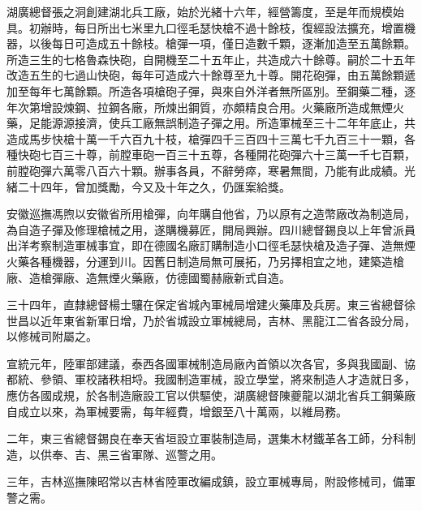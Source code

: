 \begin{pinyinscope}
湖廣總督張之洞創建湖北兵工廠，始於光緒十六年，經營籌度，至是年而規模始具。初辦時，每日所出七米里九口徑毛瑟快槍不過十餘枝，復經設法擴充，增置機器，以後每日可造成五十餘枝。槍彈一項，僅日造數千顆，逐漸加造至五萬餘顆。所造三生的七格魯森快砲，自開機至二十五年止，共造成六十餘尊。嗣於二十五年改造五生的七過山快砲，每年可造成六十餘尊至九十尊。開花砲彈，由五萬餘顆遞加至每年七萬餘顆。所造各項槍砲子彈，與來自外洋者無所區別。至鋼藥二種，逐年次第增設煉鋼、拉鋼各廠，所煉出鋼質，亦頗精良合用。火藥廠所造成無煙火藥，足能源源接濟，使兵工廠無誤制造子彈之用。所造軍械至三十二年年底止，共造成馬步快槍十萬一千六百九十枝，槍彈四千三百四十三萬七千九百三十一顆，各種快砲七百三十尊，前膛車砲一百三十五尊，各種開花砲彈六十三萬一千七百顆，前膛砲彈六萬零八百六十顆。辦事各員，不辭勞瘁，寒暑無間，乃能有此成績。光緒二十四年，曾加獎勵，今又及十年之久，仍匯案給獎。

安徽巡撫馮煦以安徽省所用槍彈，向年購自他省，乃以原有之造幣廠改為制造局，為自造子彈及修理槍械之用，遂購機募匠，開局興辦。四川總督錫良以上年曾派員出洋考察制造軍械事宜，即在德國名廠訂購制造小口徑毛瑟快槍及造子彈、造無煙火藥各種機器，分運到川。因舊日制造局無可展拓，乃另擇相宜之地，建築造槍廠、造槍彈廠、造無煙火藥廠，仿德國蜀赫廠新式自造。

三十四年，直隸總督楊士驤在保定省城內軍械局增建火藥庫及兵房。東三省總督徐世昌以近年東省新軍日增，乃於省城設立軍械總局，吉林、黑龍江二省各設分局，以修械司附屬之。

宣統元年，陸軍部建議，泰西各國軍械制造局廠內首領以次各官，多與我國副、協都統、參領、軍校諸秩相埒。我國制造軍械，設立學堂，將來制造人才造就日多，應仿各國成規，於各制造廠設工官以供驅使，湖廣總督陳夔龍以湖北省兵工鋼藥廠自成立以來，為軍械要需，每年經費，增銀至八十萬兩，以維局務。

二年，東三省總督錫良在奉天省垣設立軍裝制造局，選集木材鐵革各工師，分科制造，以供奉、吉、黑三省軍隊、巡警之用。

三年，吉林巡撫陳昭常以吉林省陸軍改編成鎮，設立軍械專局，附設修械司，備軍警之需。


\end{pinyinscope}
